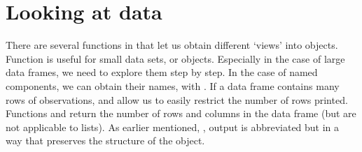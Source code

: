 \documentclass[krantz2]{krantz}\usepackage{knitr}%
\begin{document}
\section{Looking at data}\label{sec:calc:looking:at:data}
There are several functions in \Rlang that let us obtain different `views' into objects. Function  is useful for small data sets, or objects. Especially in the case of large data frames, we need to explore them step by step. In the case of named components, we can obtain their names, with . If a data frame contains many rows of observations,  and  allow us to easily restrict the number of rows printed. Functions  and  return the number of rows and columns in the data frame (but are not applicable to lists). As earlier mentioned, , output is abbreviated but in a way that preserves the structure of the object.
\end{document}
